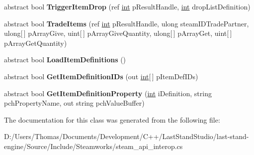 \begin{DoxyCompactItemize}
\item 
\hypertarget{classValve_1_1Steamworks_1_1ISteamInventory_ad464aae9677e1161f9d97e1321c34cf4}{}abstract bool {\bfseries Trigger\+Item\+Drop} (ref \hyperlink{SDL__thread_8h_a6a64f9be4433e4de6e2f2f548cf3c08e}{int} p\+Result\+Handle, \hyperlink{SDL__thread_8h_a6a64f9be4433e4de6e2f2f548cf3c08e}{int} drop\+List\+Definition)\label{classValve_1_1Steamworks_1_1ISteamInventory_ad464aae9677e1161f9d97e1321c34cf4}

\item 
\hypertarget{classValve_1_1Steamworks_1_1ISteamInventory_a84ce05ce4e83b1de05d1208c8fa13ee7}{}abstract bool {\bfseries Trade\+Items} (ref \hyperlink{SDL__thread_8h_a6a64f9be4433e4de6e2f2f548cf3c08e}{int} p\+Result\+Handle, ulong steam\+I\+D\+Trade\+Partner, ulong\mbox{[}$\,$\mbox{]} p\+Array\+Give, uint\mbox{[}$\,$\mbox{]} p\+Array\+Give\+Quantity, ulong\mbox{[}$\,$\mbox{]} p\+Array\+Get, uint\mbox{[}$\,$\mbox{]} p\+Array\+Get\+Quantity)\label{classValve_1_1Steamworks_1_1ISteamInventory_a84ce05ce4e83b1de05d1208c8fa13ee7}

\item 
\hypertarget{classValve_1_1Steamworks_1_1ISteamInventory_a1043e65d28eeeb09412520b9c63df01d}{}abstract bool {\bfseries Load\+Item\+Definitions} ()\label{classValve_1_1Steamworks_1_1ISteamInventory_a1043e65d28eeeb09412520b9c63df01d}

\item 
\hypertarget{classValve_1_1Steamworks_1_1ISteamInventory_a35fe8728f2f79c4ecf18e9f8dcab1c2f}{}abstract bool {\bfseries Get\+Item\+Definition\+I\+Ds} (out \hyperlink{SDL__thread_8h_a6a64f9be4433e4de6e2f2f548cf3c08e}{int}\mbox{[}$\,$\mbox{]} p\+Item\+Def\+I\+Ds)\label{classValve_1_1Steamworks_1_1ISteamInventory_a35fe8728f2f79c4ecf18e9f8dcab1c2f}

\item 
\hypertarget{classValve_1_1Steamworks_1_1ISteamInventory_a5cf9b78e30909bd1502cc78d490ae487}{}abstract bool {\bfseries Get\+Item\+Definition\+Property} (\hyperlink{SDL__thread_8h_a6a64f9be4433e4de6e2f2f548cf3c08e}{int} i\+Definition, string pch\+Property\+Name, out string pch\+Value\+Buffer)\label{classValve_1_1Steamworks_1_1ISteamInventory_a5cf9b78e30909bd1502cc78d490ae487}

\end{DoxyCompactItemize}


The documentation for this class was generated from the following file\+:\begin{DoxyCompactItemize}
\item 
D\+:/\+Users/\+Thomas/\+Documents/\+Development/\+C++/\+Last\+Stand\+Studio/last-\/stand-\/engine/\+Source/\+Include/\+Steamworks/steam\+\_\+api\+\_\+interop.\+cs\end{DoxyCompactItemize}
